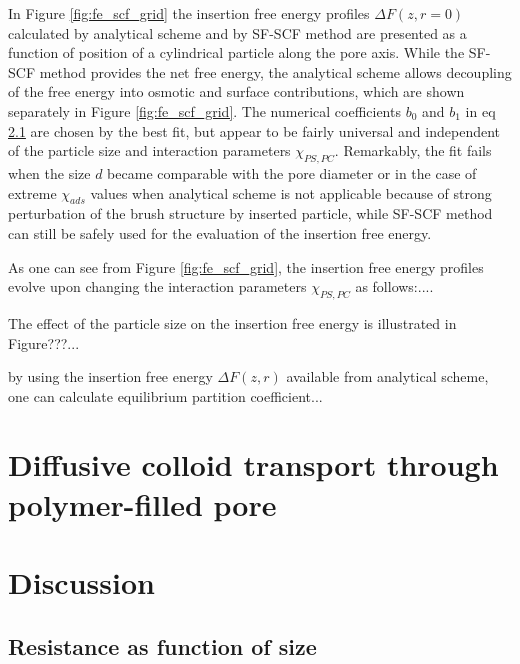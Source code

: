 \documentclass[12pt, a4paper]{article}
\newcommand\todo[1]{\textcolor{red}{#1}}
\begin{document}
In Figure \ref{fig:fe_scf_grid} the insertion free energy profiles $\Delta F(z,r=0)$ calculated by analytical scheme and by SF-SCF method are presented as a function of position of a cylindrical particle along the pore axis.
While the SF-SCF method provides the net free energy, the analytical scheme allows decoupling of the free energy into osmotic and surface contributions, which are shown separately in Figure \ref{fig:fe_scf_grid}.
The numerical coefficients $b_0$ and $b_1$ in eq \ref{} are chosen by the best fit, but appear to be fairly universal and independent of the particle size and interaction parameters $\chi_{PS,PC}$.
Remarkably, the fit fails when the size $d$ became comparable with the pore diameter or in the case of extreme $\chi_{ads}$ values when analytical scheme is not applicable because of strong perturbation 
of the brush structure by inserted particle, while SF-SCF method can still be safely used
for the evaluation of the insertion free energy.

As one can see from Figure \ref{fig:fe_scf_grid}, the insertion free energy profiles evolve upon changing the interaction parameters $\chi_{PS,PC}$ as follows:....

The effect of the particle size on the insertion free energy is illustrated in Figure???...

by using the insertion free energy $\Delta F(z,r)$ available from analytical scheme, one can calculate equilibrium partition coefficient...


\section{Diffusive colloid transport through polymer-filled pore}

% 

\section{Discussion}
\subsection{Resistance as function of size}
\end{document}
